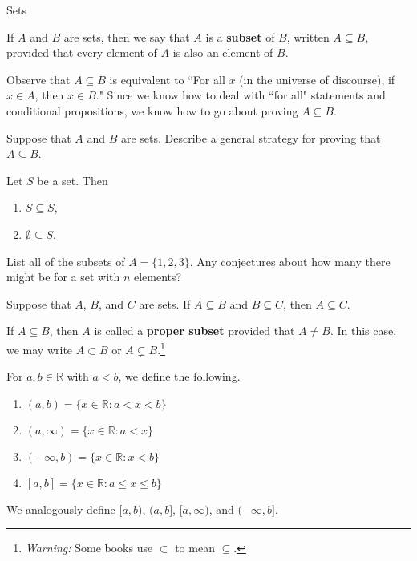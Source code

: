 \begin{section}{Sets}
\begin{definition}
If $A$ and $B$ are sets, then we say that $A$ is a \textbf{subset} of $B$, written $A\subseteq B$, provided that every element of $A$ is also an element of $B$.
\end{definition}

\begin{remark}
Observe that $A\subseteq B$ is equivalent to ``For all $x$ (in the universe of discourse), if $x\in A$, then $x\in B$."  Since we know how to deal with ``for all" statements and conditional propositions, we know how to go about proving $A\subseteq B$.
\end{remark}

\begin{question}
Suppose that $A$ and $B$ are sets.  Describe a general strategy for proving that $A\subseteq B$.
\end{question}

\begin{theorem}
Let $S$ be a set.  Then
\begin{enumerate}
\item $S\subseteq S$,
\item $\emptyset \subseteq S$.
\end{enumerate}
\end{theorem}

\begin{exercise}
List all of the subsets of $A=\{1,2,3\}$.  Any conjectures about how many there might be for a set with $n$ elements?
\end{exercise}

\begin{theorem}
Suppose that $A$, $B$, and $C$ are sets.  If $A\subseteq B$ and $B\subseteq C$, then $A\subseteq C$.
\end{theorem}

\begin{definition}
If $A\subseteq B$, then $A$ is called a \textbf{proper subset} provided that $A\neq B$.  In this case, we may write $A\subset B$ or $A\subsetneq B$.\footnote{\emph{Warning:} Some books use $\subset$ to mean $\subseteq$.}
\end{definition}

\begin{definition}
For $a,b\in\mathbb{R}$ with $a<b$, we define the following.
\begin{enumerate}
\item $(a,b)=\{x\in\mathbb{R}:a<x<b\}$
\item $(a,\infty)=\{x\in\mathbb{R}:a<x\}$
\item $(-\infty,b)=\{x\in\mathbb{R}:x<b\}$
\item $[a,b]=\{x\in\mathbb{R}:a\leq x\leq b\}$
\end{enumerate}
We analogously define $[a,b)$, $(a,b]$, $[a,\infty)$, and $(-\infty,b]$.
\end{definition}


\end{section}
